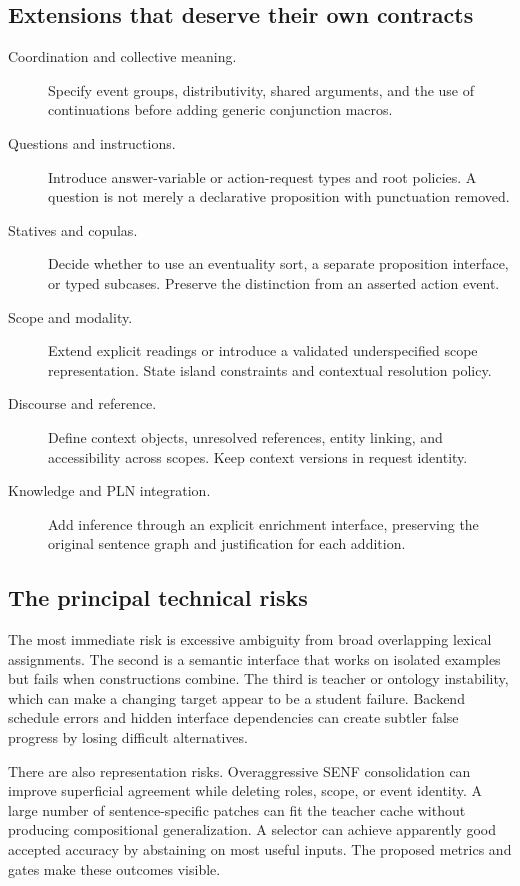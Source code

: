 \documentclass[11pt,a4paper]{article}
\begin{document}
\subsection{Extensions that deserve their own contracts}
\begin{description}
  \item[Coordination and collective meaning.]
  Specify event groups, distributivity, shared arguments, and the use of
  continuations before adding generic conjunction macros.
  \item[Questions and instructions.]
  Introduce answer-variable or action-request types and root policies.
  A question is not merely a declarative proposition with punctuation removed.
  \item[Statives and copulas.]
  Decide whether to use an eventuality sort, a separate proposition interface,
  or typed subcases. Preserve the distinction from an asserted action event.
  \item[Scope and modality.]
  Extend explicit readings or introduce a validated underspecified scope
  representation. State island constraints and contextual resolution policy.
  \item[Discourse and reference.]
  Define context objects, unresolved references, entity linking, and
  accessibility across scopes. Keep context versions in request identity.
  \item[Knowledge and PLN integration.]
  Add inference through an explicit enrichment interface, preserving the
  original sentence graph and justification for each addition.
\end{description}

\subsection{The principal technical risks}
The most immediate risk is excessive ambiguity from broad overlapping
lexical assignments. The second is a semantic interface that works on
isolated examples but fails when constructions combine. The third is teacher
or ontology instability, which can make a changing target appear to be a
student failure. Backend schedule errors and hidden interface dependencies
can create subtler false progress by losing difficult alternatives.

There are also representation risks. Overaggressive SENF consolidation can
improve superficial agreement while deleting roles, scope, or event
identity. A large number of sentence-specific patches can fit the teacher
cache without producing compositional generalization. A selector can achieve
apparently good accepted accuracy by abstaining on most useful inputs.
The proposed metrics and gates make these outcomes visible.
\end{document}
